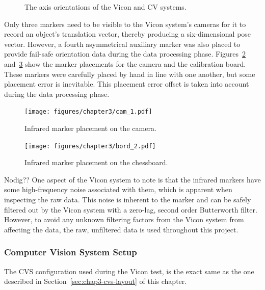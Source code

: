 \begin{figure}
  \centering
  \def\svgwidth{0.5\textwidth}
  
  \caption{The axis orientations of the Vicon and CV systems.}
\label{fig:chap3-cam-vicon-axes}
\end{figure}

Only three markers need to be visible to the Vicon system's cameras for it to record an object's translation vector, thereby producing a six-dimensional pose vector. However, a fourth asymmetrical auxiliary marker was also placed to provide fail-safe orientation data during the data processing phase. Figures~\ref{fig:chap3-cam-marker-placement} and~\ref{fig:chap3-board-marker-placement} show the marker placements for the camera and the calibration board. These markers were carefully placed by hand in line with one another, but some placement error is inevitable. This placement error offset is taken into account during the data processing phase. 

\begin{figure}
   \centering 
   \texttt{[image: figures/chapter3/cam\_1.pdf]}
   \caption{Infrared marker placement on the camera.}
\label{fig:chap3-cam-marker-placement}
\end{figure}

\begin{figure}
   \centering 
   \texttt{[image: figures/chapter3/bord\_2.pdf]}
   \caption{Infrared marker placement on the chessboard.}
\label{fig:chap3-board-marker-placement}
\end{figure}

Nodig?? One aspect of the Vicon system to note is that the infrared markers have some high-frequency noise associated with them, which is apparent when inspecting the raw data. This noise is inherent to the marker and can be safely filtered out by the Vicon system with a zero-lag, second order Butterworth filter. However, to avoid any unknown filtering factors from the Vicon system from affecting the data, the raw, unfiltered data is used throughout this project. 

\subsubsection{Computer Vision System Setup}

The CVS configuration used during the Vicon test, is the exact same as the one described in Section~\ref{sec:chap3-cvs-layout} of this chapter.

